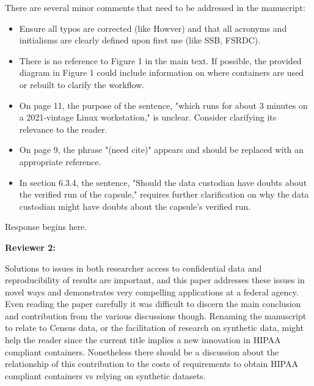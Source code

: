 \begin{referee}

     There are several minor comments that need to be addressed in the manuscript:
    \begin{itemize}
        \item Ensure all typos are corrected (like Howver) and that all acronyms and initialisms are clearly defined upon first use (like SSB, FSRDC). 
        \item There is no reference to Figure 1 in the main text. If possible, the provided diagram in Figure 1 could include information on where containers are used or rebuilt to clarify the workflow. 
        \item On page 11, the purpose of the sentence, "which runs for about 3 minutes on a 2021-vintage Linux workstation," is unclear.  Consider clarifying its relevance to the reader. 
        \item On page 9, the phrase "(need cite)" appears and should be replaced with an appropriate reference. 
         \item In section 6.3.4, the sentence, "Should the data custodian have doubts about the verified run of the capsule," requires further clarification on why the data custodian might have doubts about the capsule's verified run. 
    \end{itemize}

\end{referee}

\begin{response}
    Response begins here.
\end{response}

\textbf{Reviewer 2:}

\begin{referee}
    Solutions to issues in both researcher access to confidential data and reproducibility of
results are important, and this paper addresses these issues in novel ways and demonstrates very
compelling applications at a federal agency. Even reading the paper carefully it was difficult to discern
the main conclusion and contribution from the various discussions though. Renaming the manuscript
to relate to Census data, or the facilitation of research on synthetic data, might help the reader since
the current title implies a new innovation in HIPAA compliant containers. Nonetheless there should be
a discussion about the relationship of this contribution to the costs of requirements to obtain HIPAA
compliant containers vs relying on synthetic datasets. 
\end{referee}

